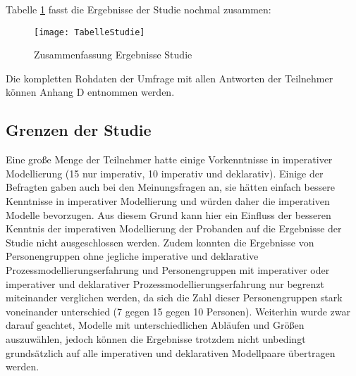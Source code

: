 Tabelle \ref{fig:TabelleStudie} fasst die Ergebnisse der Studie nochmal zusammen:

\begin{figure}[htp]
\begin{center}
  \texttt{[image: TabelleStudie]} %
  \caption{Zusammenfassung Ergebnisse Studie}
  \label{fig:TabelleStudie}
\end{center}
\end{figure}

Die kompletten Rohdaten der Umfrage mit allen Antworten der Teilnehmer können Anhang D entnommen werden.

\subsection{Grenzen der Studie}

Eine große Menge der Teilnehmer hatte einige Vorkenntnisse in imperativer Modellierung (15 nur imperativ, 10 imperativ und deklarativ). Einige der Befragten gaben auch bei den Meinungsfragen an, sie hätten einfach bessere Kenntnisse in imperativer Modellierung und würden daher die imperativen Modelle bevorzugen. Aus diesem Grund kann hier ein Einfluss der besseren Kenntnis der imperativen Modellierung der Probanden auf die Ergebnisse der Studie nicht ausgeschlossen werden. \newline 
Zudem konnten die Ergebnisse von Personengruppen ohne jegliche imperative und deklarative Prozessmodellierungserfahrung und Personengruppen mit imperativer oder imperativer und deklarativer Prozessmodellierungserfahrung nur begrenzt miteinander verglichen werden, da sich die Zahl dieser Personengruppen stark voneinander unterschied (7 gegen 15 gegen 10 Personen).\newline
Weiterhin wurde zwar darauf geachtet, Modelle mit unterschiedlichen Abläufen und Größen auszuwählen, jedoch können die Ergebnisse trotzdem nicht unbedingt grundsätzlich auf alle imperativen und deklarativen Modellpaare übertragen werden. \newline

 











